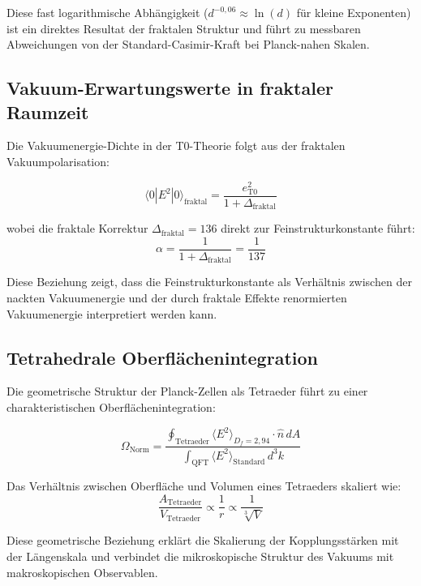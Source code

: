 \documentclass[12pt,a4paper]{article}
\theoremstyle{definition}
\begin{document}
	Diese fast logarithmische Abhängigkeit ($d^{-0{,}06} \approx \ln(d)$ für kleine Exponenten) ist ein direktes Resultat der fraktalen Struktur und führt zu messbaren Abweichungen von der Standard-Casimir-Kraft bei Planck-nahen Skalen.
	
	\subsection{Vakuum-Erwartungswerte in fraktaler Raumzeit}
	
	Die Vakuumenergie-Dichte in der T0-Theorie folgt aus der fraktalen Vakuumpolarisation:
	
	\begin{equation}
		\langle 0|E^2|0 \rangle_{\text{fraktal}} = \frac{e_{\text{T0}}^2}{1 + \Delta_{\text{fraktal}}}
	\end{equation}
	
	wobei die fraktale Korrektur $\Delta_{\text{fraktal}} = 136$ direkt zur Feinstrukturkonstante führt:
	\begin{equation}
		\alpha = \frac{1}{1 + \Delta_{\text{fraktal}}} = \frac{1}{137}
	\end{equation}
	
	Diese Beziehung zeigt, dass die Feinstrukturkonstante als Verhältnis zwischen der nackten Vakuumenergie und der durch fraktale Effekte renormierten Vakuumenergie interpretiert werden kann.
	
	\subsection{Tetrahedrale Oberflächenintegration}
	
	Die geometrische Struktur der Planck-Zellen als Tetraeder führt zu einer charakteristischen Oberflächenintegration:
	
	\begin{equation}
		\Omega_{\text{Norm}} = \frac{\oint_{\text{Tetraeder}} \langle E^2 \rangle_{D_f=2{,}94} \cdot \hat{n} \, dA}{\int_{\text{QFT}} \langle E^2 \rangle_{\text{Standard}} \, d^3k}
	\end{equation}
	
	Das Verhältnis zwischen Oberfläche und Volumen eines Tetraeders skaliert wie:
	\begin{equation}
		\frac{A_{\text{Tetraeder}}}{V_{\text{Tetraeder}}} \propto \frac{1}{r} \propto \frac{1}{\sqrt[3]{V}}
	\end{equation}
	
	Diese geometrische Beziehung erklärt die Skalierung der Kopplungsstärken mit der Längenskala und verbindet die mikroskopische Struktur des Vakuums mit makroskopischen Observablen.
	
\end{document}
